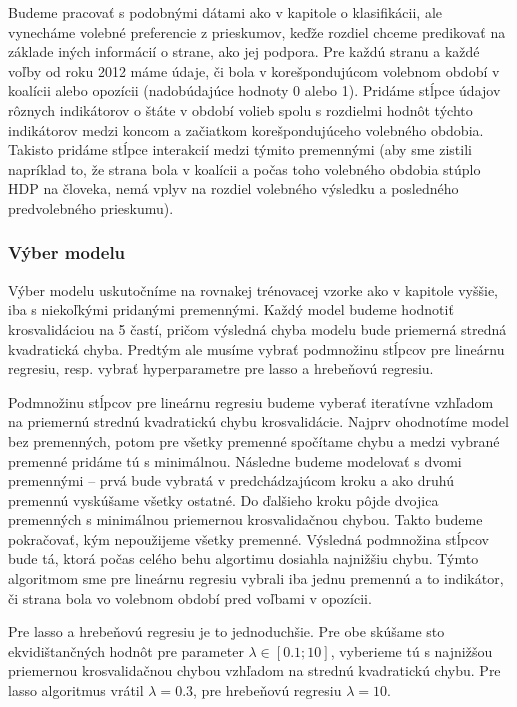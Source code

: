 \documentclass[main.tex]{subfiles}
\begin{document}
Budeme pracovať s podobnými dátami ako v kapitole o klasifikácii, ale vynecháme volebné preferencie z prieskumov, keďže rozdiel chceme predikovať na základe iných informácií o strane, ako jej podpora. Pre každú stranu a každé voľby od roku 2012 máme údaje, či bola v korešpondujúcom volebnom období v koalícii alebo opozícii (nadobúdajúce hodnoty 0 alebo 1). Pridáme stĺpce údajov rôznych indikátorov o štáte v období volieb spolu s rozdielmi hodnôt týchto indikátorov medzi koncom a začiatkom korešpondujúceho volebného obdobia. Takisto pridáme stĺpce interakcií medzi týmito premennými (aby sme zistili napríklad to, že strana bola v koalícii a počas toho volebného obdobia stúplo HDP na človeka, nemá vplyv na rozdiel volebného výsledku a posledného predvolebného prieskumu).

\subsubsection{Výber modelu}

Výber modelu uskutočníme na rovnakej trénovacej vzorke ako v kapitole vyššie, iba s niekoľkými pridanými premennými. Každý model budeme hodnotiť krosvalidáciou na 5 častí, pričom výsledná chyba modelu bude priemerná stredná kvadratická chyba. Predtým ale musíme vybrať podmnožinu stĺpcov pre lineárnu regresiu, resp. vybrať hyperparametre pre lasso a hrebeňovú regresiu. 

Podmnožinu stĺpcov pre lineárnu regresiu budeme vyberať iteratívne vzhľadom na priemernú strednú kvadratickú chybu krosvalidácie. Najprv ohodnotíme model bez premenných, potom pre všetky premenné spočítame chybu a medzi vybrané premenné pridáme tú s minimálnou. Následne budeme modelovať s dvomi premennými -- prvá bude vybratá v predchádzajúcom kroku a ako druhú premennú vyskúšame všetky ostatné. Do ďalšieho kroku pôjde dvojica premenných s minimálnou priemernou krosvalidačnou chybou. Takto budeme pokračovať, kým nepoužijeme všetky premenné. Výsledná podmnožina stĺpcov bude tá, ktorá počas celého behu algortimu dosiahla najnižšiu chybu. Týmto algoritmom sme pre lineárnu regresiu vybrali iba jednu premennú a to indikátor, či strana bola vo volebnom období pred voľbami v opozícii.

Pre lasso a hrebeňovú regresiu je to jednoduchšie. Pre obe skúšame sto ekvidištančných hodnôt pre parameter $\lambda \in [0.1; 10]$, vyberieme tú s najnižšou priemernou krosvalidačnou chybou vzhľadom na strednú kvadratickú chybu. Pre lasso algoritmus vrátil $\lambda=0.3$, pre hrebeňovú regresiu $\lambda = 10$. 
\end{document}
